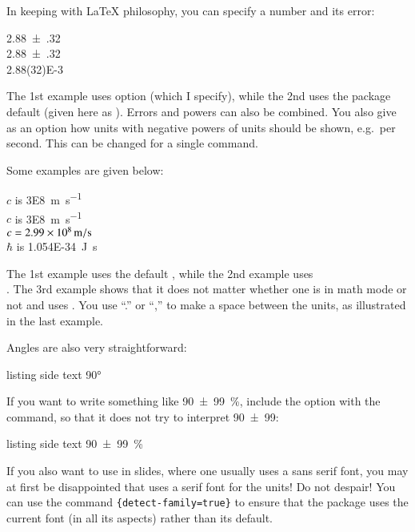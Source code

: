 In keeping with \LaTeX{} philosophy, you can specify a number and its
error:
\begin{tcblisting}{}
\num{2.88(32)}\\
\num[separate-uncertainty=false]{2.88(32)}\\
\num{2.88(32)E-3}
\end{tcblisting}
The 1st example uses  option
(which I specify), while the 2nd uses the package default
(given here as ).
Errors and powers can also be combined.
You also give as
an option how units with negative powers of units should be shown,
e.g.\ per second. This can be changed for a single command.

Some examples are given below:
\begin{tcblisting}{}
\(c\) is \SI{3E8}{\metre\per\second}\\
\(c\) is \SI[per-mode=fraction, fraction-function=\sfrac]{3E8}{\metre\per\second}\\
\(c = \SI[per-mode=symbol]{2.99E8}{\metre\per\second}\)\\
\(\hbar\) is \SI{1.054E-34}{\joule.\second}
\end{tcblisting}
\noindent
The 1st example uses the default ,
while the 2nd example uses\\
.
The 3rd example shows that it does not matter whether one is in math mode or not
and uses .
You use \enquote{.} or \enquote{,} to make a space between the units,
as illustrated in the last example.

Angles are also very straightforward:
\begin{tcblisting}{listing side text}
\ang{90}
\end{tcblisting}

If you want to write something like \SI[parse-numbers=false]{90(99)}{\%},
include the option  with the  command,
so that it does not try to interpret \num[parse-numbers=false]{90(99)}:
\begin{tcblisting}{listing side text}
\SI[parse-numbers=false]{90(99)}{\%}
\end{tcblisting}

If you also want to use  in slides, where one usually
uses a sans serif font, you may at first be disappointed that
 uses a serif font for the units! Do not despair!
You can use the command
\texttt{\{detect-family=true\}}
to ensure that the package uses the current font
(in all its aspects) rather than its default.


